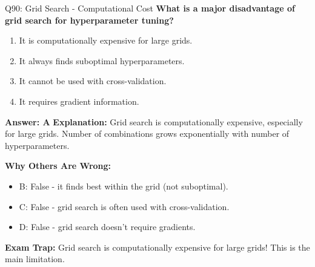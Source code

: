 \documentclass[8pt]{beamer}
\begin{document}
	\begin{frame}{Q90: Grid Search - Computational Cost}
		\fontsize{6.5}{7.5}\selectfont
		\textbf{What is a major disadvantage of grid search for hyperparameter tuning?}
		
		\begin{enumerate}
			\item It is computationally expensive for large grids.
			\item It always finds suboptimal hyperparameters.
			\item It cannot be used with cross-validation.
			\item It requires gradient information.
		\end{enumerate}
		
		\vspace{0.05cm}
		\textcolor{myblue}{\textbf{Answer: A}}
		\vspace{0.05cm}
		\textcolor{myblue}{\textbf{Explanation:}} Grid search is computationally expensive, especially for large grids. Number of combinations grows exponentially with number of hyperparameters.
		
		\vspace{0.05cm}
		\textcolor{myred}{\textbf{Why Others Are Wrong:}}
		\begin{itemize}
			\item \textcolor{myred}{B:} False - it finds best within the grid (not suboptimal).
			\item \textcolor{myred}{C:} False - grid search is often used with cross-validation.
			\item \textcolor{myred}{D:} False - grid search doesn't require gradients.
		\end{itemize}
		
		\textcolor{myred}{\textbf{Exam Trap:}} Grid search is \textcolor{myred}{computationally expensive} for large grids! This is the main limitation.
	\end{frame}
	
	
\end{document}
